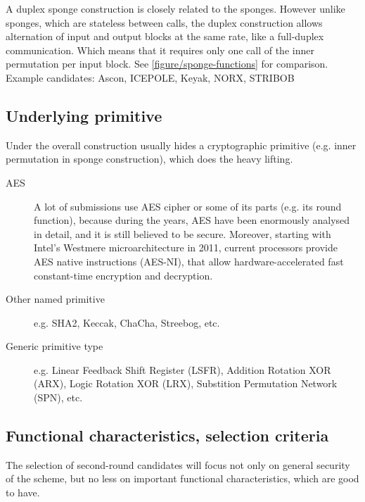 \begin{description}
\begin{description}
    A duplex sponge construction is closely related to the sponges. However unlike sponges, which are stateless between calls, the duplex construction allows alternation of input and output blocks at the same rate, like a full-duplex communication. Which means that it requires only one call of the inner permutation per input block. \cite{duplex-functions} See \autoref{figure/sponge-functions} for comparison. \\
    Example candidates: Ascon, ICEPOLE, Keyak, NORX, STRIBOB
  \end{description}
\end{description}


\subsection{Underlying primitive}

Under the overall construction usually hides a cryptographic primitive (e.g. inner permutation in sponge construction), which does the heavy lifting.

\begin{description}
  \item[AES] A lot of submissions use AES cipher or some of its parts (e.g. its round function), because during the years, AES have been enormously analysed in detail, and it is still believed to be secure. Moreover, starting with Intel's Westmere microarchitecture in 2011, current processors provide AES native instructions (AES-NI), that allow hardware-accelerated fast constant-time encryption and decryption.
  \item[Other named primitive] e.g. SHA2, Keccak, ChaCha, Streebog, etc.
  \item[Generic primitive type] e.g. Linear Feedback Shift Register (LSFR), Addition Rotation XOR (ARX), Logic Rotation XOR (LRX), Substition Permutation Network (SPN), etc.
\end{description}


\subsection{Functional characteristics, selection criteria}

The selection of second-round candidates will focus not only on general security of the scheme, but no less on important functional characteristics, which are good to have.

